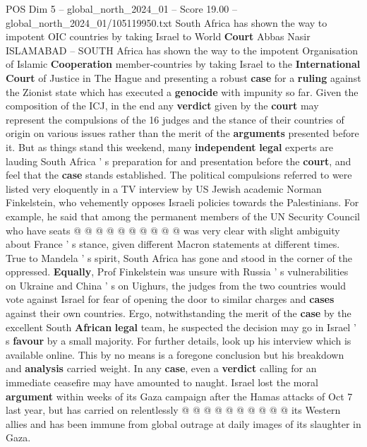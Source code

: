 \begin{textsample}{POS Dim 5 – global\_north\_2024\_01 – Score 19.00 – global\_north\_2024\_01/105119950.txt}  \label{ex:f5_pos_138}
South Africa has shown the way to impotent OIC countries by taking Israel to World \textbf{Court} Abbas Nasir ISLAMABAD -- SOUTH Africa has shown the way to the impotent Organisation of Islamic \textbf{Cooperation} member-countries by taking Israel to the \textbf{International} \textbf{Court} of Justice in The Hague and presenting a robust \textbf{case} for a \textbf{ruling} against the Zionist state which has executed a \textbf{genocide} with impunity so far.
Given the composition of the ICJ, in the end any \textbf{verdict} given by the \textbf{court} may represent the compulsions of the 16 judges and the stance of their countries of origin on various issues rather than the merit of the \textbf{arguments} presented before it.
But as things stand this weekend, many \textbf{independent} \textbf{legal} experts are lauding South Africa ' s preparation for and presentation before the \textbf{court}, and feel that the \textbf{case} stands established.
The political compulsions referred to were listed very eloquently in a TV interview by US Jewish academic Norman Finkelstein, who vehemently opposes Israeli policies towards the Palestinians.
For example, he said that among the permanent members of the UN Security Council who have seats @ @ @ @ @ @ @ @ @ @ was very clear with slight ambiguity about France ' s stance, given different Macron statements at different times.
True to Mandela ' s spirit, South Africa has gone and stood in the corner of the oppressed. \textbf{Equally}, Prof Finkelstein was unsure with Russia ' s vulnerabilities on Ukraine and China ' s on Uighurs, the judges from the two countries would vote against Israel for fear of opening the door to similar charges and \textbf{cases} against their own countries.
Ergo, notwithstanding the merit of the \textbf{case} by the excellent South \textbf{African} \textbf{legal} team, he suspected the decision may go in Israel ' s \textbf{favour} by a small majority.
For further details, look up his interview which is available online.
This by no means is a foregone conclusion but his breakdown and \textbf{analysis} carried weight.
In any \textbf{case}, even a \textbf{verdict} calling for an immediate ceasefire may have amounted to naught.
Israel lost the moral \textbf{argument} within weeks of its Gaza campaign after the Hamas attacks of Oct 7 last year, but has carried on relentlessly @ @ @ @ @ @ @ @ @ @ its Western allies and has been immune from global outrage at daily images of its slaughter in Gaza.

\end{textsample}

